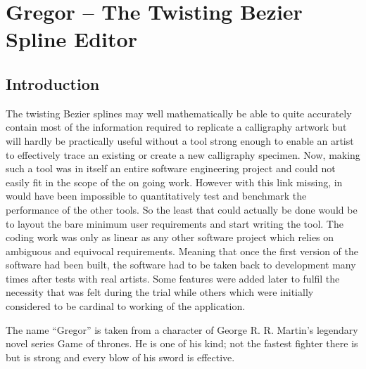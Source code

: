 \section{Gregor -- The Twisting Bezier Spline Editor}\label{Chapter:Gregor}
\subsection{Introduction}
{
    The twisting Bezier splines may well mathematically be able to quite accurately contain most of the information required to replicate a calligraphy artwork but will hardly be practically useful without a tool strong enough to enable an artist to effectively trace an existing or create a new calligraphy specimen. Now, making such a tool was in itself an entire software engineering project and could not easily fit in the scope of the on going work. However with this link missing, in would have been impossible to quantitatively test and benchmark the performance of the other tools. So the least that could actually be done would be to layout the bare minimum user requirements and start writing the tool. The coding work was only as linear as any other software project which relies on ambiguous and equivocal requirements. Meaning that once the first version of the software had been built, the software had to be taken back to development many times after tests with real artists. Some features were added later to fulfil the necessity that was felt during the trial while others which were initially considered to be cardinal to working of the application.

    The name ``Gregor'' is taken from a character of George R. R. Martin's legendary novel\cite{bib19} series Game of thrones. He is one of his kind; not the fastest fighter there is but is strong and every blow of his sword is effective.

}
